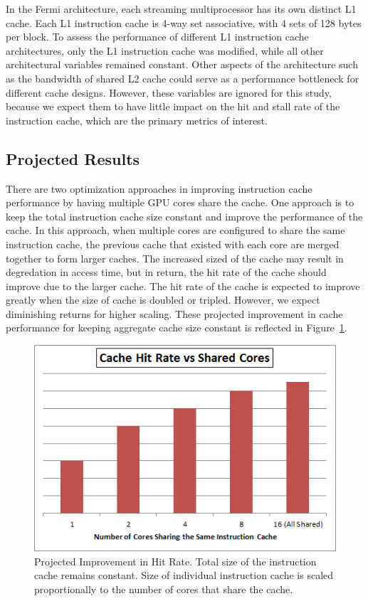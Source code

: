 In the Fermi architecture, each streaming multiprocessor has
its own distinct L1 cache. 
Each L1 instruction cache is 4-way set associative, with 4 sets of
128 bytes per block. 
To assess the  performance of different L1 instruction cache
architectures, only the L1 instruction cache was modified, while all
other architectural variables remained constant. 
Other aspects of the architecture such as the bandwidth of shared L2
cache could serve as a performance bottleneck for different cache
designs. 
However, these variables are ignored for this study, because we expect
them to have little impact on the hit and stall rate of the
instruction cache, which are the primary metrics of interest.

\subsection{Projected Results}

There are two optimization approaches in improving instruction cache performance by having
multiple GPU cores share the cache. 
One approach is to keep the total instruction cache size constant and
improve the performance of the cache.
In this approach, when multiple cores are configured to share the same
instruction cache, the previous cache that existed with each core are
merged together to form larger caches. 
The increased sized of the cache may result in degredation in access
time, but in return, the hit rate of the cache should improve due to
the larger cache. 
The hit rate of the cache is expected to improve greatly when the size
of cache is doubled or tripled. However, we expect diminishing returns
for higher scaling. 
These projected improvement in cache performance for keeping aggregate cache size 
constant is reflected in Figure~\ref{HitImprov}. 


\begin{figure}[t]
\centering
\includegraphics[width=\columnwidth]{graphics/HitRateImprov.png}
\caption{Projected Improvement in Hit Rate. Total size of the instruction
cache remains constant. Size of individual instruction cache is scaled 
proportionally to the number of cores that share the cache.}
\label{HitImprov}
\end{figure}


